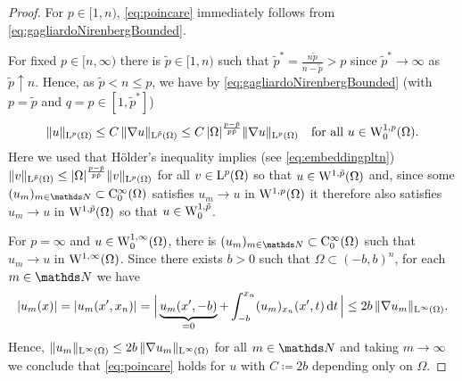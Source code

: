 \begin{proof}
  For $p \in [1,n)$, \eqref{eq:poincare} immediately follows from \eqref{eq:gagliardoNirenbergBounded}. 
  
  For fixed $p \in [n, \infty)$ there is $\tilde p \in [1,n)$ such that $\tilde p^* = \frac{n \tilde p}{n - \tilde p} > p$ since $\tilde p^* \to \infty$ as $\tilde p \uparrow n$.
    Hence, as $\tilde p < n \leq p$, we have by \eqref{eq:gagliardoNirenbergBounded} (with $p = \tilde p$ and $q = p \in [1,\tilde p^*]$)
    \begin{equation}
      \label{eq:gradientEstimatePoincare}
      \|u\|_{\mathrm{L}^p(\Omega)} 
      \leq C \, \|\nabla u\|_{\mathrm{L}^{\tilde p}(\Omega)}
      \leq C \, |\Omega|^{\frac{p - \tilde p}{p \tilde p}} \|\nabla u\|_{\mathrm{L}^p(\Omega)} \quad\text{for all } u \in \mathrm{W}_0^{1,p}(\Omega).
    \end{equation}
    Here we used that Hölder's inequality implies (see \eqref{eq:embeddingpltn}) $\|v\|_{\mathrm{L}^{\tilde p}(\Omega)} \leq |\Omega|^{\frac{p - \tilde p}{p \tilde p}} \|v\|_{\mathrm{L}^p(\Omega)}$ for all $v \in \mathrm{L}^p(\Omega)$ so that $u \in \mathrm{W}^{1,\tilde p}(\Omega)$ and, since some $(u_m)_{m \in \N} \subset \CC_0^\infty(\Omega)$ satisfies $u_m \to u$ in $\mathrm{W}^{1,p}(\Omega)$ it therefore also satisfies $u_m \to u$ in $\mathrm{W}^{1,\tilde p}(\Omega)$ so that $u \in \mathrm{W}_0^{1,\tilde p}$.

    For $p = \infty$ and $u \in \mathrm{W}_0^{1,\infty}(\Omega)$, there is $(u_m)_{m \in \N} \subset \CC_0^\infty(\Omega)$ such that $u_m \to u$ in $\mathrm{W}^{1,\infty}(\Omega)$.
    Since there exists $b > 0$ such that $\Omega \subset (-b,b)^n$, for each $m \in \N$ we have
    $$
    |u_m(x)| 
    = | u_m(x',x_n)|
    = \Big|\underbrace{u_m(x', -b)}_{= 0} + \int_{-b}^{x_n} (u_m)_{x_n} (x',t)\, {\operatorname{d}\!{t}} \,\Big|
    \leq 2b \, \|\nabla u_m \|_{\mathrm{L}^\infty(\Omega)}.
    $$
    Hence, $\|u_m\|_{\mathrm{L}^\infty(\Omega)} \leq 2b \, \|\nabla u_m\|_{\mathrm{L}^\infty(\Omega)}$ for all $m \in \N$ and taking $m \to \infty$ we conclude that \eqref{eq:poincare} holds for $u$ with $C \coloneqq 2b$ depending only on $\Omega$.
\end{proof}

